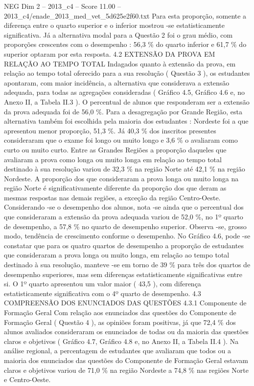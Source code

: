 \begin{textsample}{NEG Dim 2 – 2013\_c4 – Score 11.00 – 2013\_c4/enade\_2013\_med\_vet\_5d625e2f60.txt}
Para esta proporção, somente a diferença entre o quarto superior e o inferior mostrou -se estatisticamente significativa.
Já a alternativa modal para a Questão 2 foi o grau médio, com proporções crescentes com o desempenho : 56,3 \% do quarto inferior e 61,7 \% do superior optaram por esta resposta. 4.2 EXTENSÃO DA PROVA EM RELAÇÃO AO TEMPO TOTAL Indagados quanto à extensão da prova, em relação ao tempo total oferecido para a sua resolução ( Questão 3 ), os estudantes apontaram, com maior incidência, a alternativa que considerava a extensão adequada, para todas as agregações consideradas ( Gráfico 4.5, Gráfico 4.6 e, no Anexo II, a Tabela II.3 ).
O percentual de alunos que responderam ser a extensão da prova adequada foi de 56,0 \%.
Para a desagregação por Grande Região, esta alternativa também foi escolhida pela maioria dos estudantes : Nordeste foi a que apresentou menor proporção, 51,3 \%.
Já 40,3 \% dos inscritos presentes consideraram que o exame foi longo ou muito longo e 3,6 \% o avaliaram como curto ou muito curto.
Entre as Grandes Regiões a proporção daqueles que avaliaram a prova como longa ou muito longa em relação ao tempo total destinado à sua resolução variou de 32,3 \% na região Norte até 42,1 \% na região Nordeste.
A proporção dos que consideraram a prova longa ou muito longa na região Norte é significativamente diferente da proporção dos que deram as mesmas respostas nas demais regiões, a exceção da região Centro-Oeste.
Considerando -se o desempenho dos alunos, nota -se ainda que o percentual dos que consideraram a extensão da prova adequada variou de 52,0 \%, no 1º quarto de desempenho, a 57,8 \% no quarto de desempenho superior.
Observa -se, grosso modo, tendência de crescimento conforme o desempenho.
No Gráfico 4.6, pode -se constatar que para os quatro quartos de desempenho a proporção de estudantes que consideraram a prova longa ou muito longa, em relação ao tempo total destinado à sua resolução, manteve -se em torno de 39 \% para três dos quartos de desempenho superiores, mas sem diferenças estatisticamente significativas entre si.
O 1º quarto apresentou um valor maior ( 43,5 ), com diferença estatisticamente significativa com o 4º quarto de desempenho. 4.3 COMPREENSÃO DOS ENUNCIADOS DAS QUESTÕES 4.3.1 Componente de Formação Geral Com relação aos enunciados das questões do Componente de Formação Geral ( Questão 4 ), as opiniões foram positivas, já que 72,4 \% dos alunos avaliados consideraram os enunciados de todas ou da maioria das questões claros e objetivos ( Gráfico 4.7, Gráfico 4.8 e, no Anexo II, a Tabela II.4 ).
Na análise regional, a percentagem de estudantes que avaliaram que todos ou a maioria dos enunciados das questões do Componente de Formação Geral estavam claros e objetivos variou de 71,0 \% na região Nordeste a 74,8 \% nas regiões Norte e Centro-Oeste.

\end{textsample}
